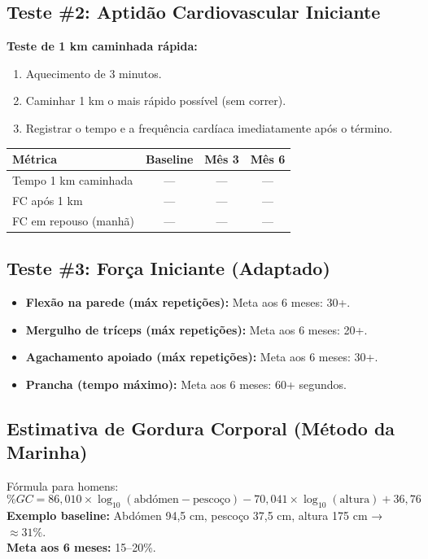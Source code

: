 \documentclass[12pt,a4paper]{scrartcl}
\begin{document}
\subsection{Teste \#2: Aptidão Cardiovascular Iniciante}
\textbf{Teste de 1 km caminhada rápida:}
\begin{enumerate}
    \item Aquecimento de 3 minutos.
    \item Caminhar 1 km o mais rápido possível (sem correr).
    \item Registrar o tempo e a frequência cardíaca imediatamente após o término.
\end{enumerate}
\begin{table}[h]
\centering
\begin{tabular}{lccc}
\toprule
Métrica & Baseline & Mês 3 & Mês 6 \\
\midrule
Tempo 1 km caminhada & — & — & — \\
FC após 1 km & — & — & — \\
FC em repouso (manhã) & — & — & — \\
\bottomrule
\end{tabular}
\end{table}

\subsection{Teste \#3: Força Iniciante (Adaptado)}
\begin{itemize}
    \item \textbf{Flexão na parede (máx repetições):} Meta aos 6 meses: 30+.
    \item \textbf{Mergulho de tríceps (máx repetições):} Meta aos 6 meses: 20+.
    \item \textbf{Agachamento apoiado (máx repetições):} Meta aos 6 meses: 30+.
    \item \textbf{Prancha (tempo máximo):} Meta aos 6 meses: 60+ segundos.
\end{itemize}

\subsection{Estimativa de Gordura Corporal (Método da Marinha)}
Fórmula para homens:
\[
\%GC = 86{,}010 \times \log_{10}(\text{abdómen} - \text{pescoço}) - 70{,}041 \times \log_{10}(\text{altura}) + 36{,}76
\]
\textbf{Exemplo baseline:} Abdómen 94,5 cm, pescoço 37,5 cm, altura 175 cm → $\approx 31\%$. \\
\textbf{Meta aos 6 meses:} 15–20\%.
\end{document}

